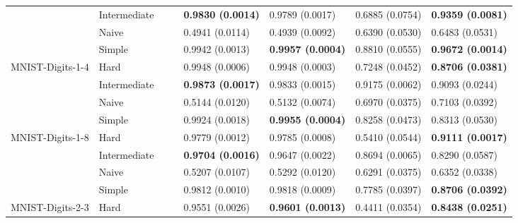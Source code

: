 \begin{tabular}{llllllll}
                 & Intermediate &                  &                           &  \textbf{0.9830 (0.0014)} &           0.9789 (0.0017) &           0.6885 (0.0754) &  \textbf{0.9359 (0.0081)} \\
                 & Naive &                  &                           &           0.4941 (0.0114) &           0.4939 (0.0092) &           0.6390 (0.0530) &           0.6483 (0.0531) \\
                 & Simple &                  &                           &           0.9942 (0.0013) &  \textbf{0.9957 (0.0004)} &           0.8810 (0.0555) &  \textbf{0.9672 (0.0014)} \\
MNIST-Digits-1-4 & Hard &                  &                           &           0.9948 (0.0006) &           0.9948 (0.0003) &           0.7248 (0.0452) &  \textbf{0.8706 (0.0381)} \\
                 & Intermediate &                  &                           &  \textbf{0.9873 (0.0017)} &           0.9833 (0.0015) &           0.9175 (0.0062) &           0.9093 (0.0244) \\
                 & Naive &                  &                           &           0.5144 (0.0120) &           0.5132 (0.0074) &           0.6970 (0.0375) &           0.7103 (0.0392) \\
                 & Simple &                  &                           &           0.9924 (0.0018) &  \textbf{0.9955 (0.0004)} &           0.8258 (0.0473) &           0.8313 (0.0530) \\
MNIST-Digits-1-8 & Hard &                  &                           &           0.9779 (0.0012) &           0.9785 (0.0008) &           0.5410 (0.0544) &  \textbf{0.9111 (0.0017)} \\
                 & Intermediate &                  &                           &  \textbf{0.9704 (0.0016)} &           0.9647 (0.0022) &           0.8694 (0.0065) &           0.8290 (0.0587) \\
                 & Naive &                  &                           &           0.5207 (0.0107) &           0.5292 (0.0120) &           0.6291 (0.0375) &           0.6352 (0.0338) \\
                 & Simple &                  &                           &           0.9812 (0.0010) &           0.9818 (0.0009) &           0.7785 (0.0397) &  \textbf{0.8706 (0.0392)} \\
MNIST-Digits-2-3 & Hard &                  &                           &           0.9551 (0.0026) &  \textbf{0.9601 (0.0013)} &           0.4411 (0.0354) &  \textbf{0.8438 (0.0251)} \\

\end{tabular}
